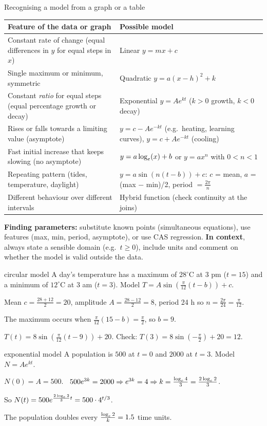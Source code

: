 \begin{keyres}{Recognising a model from a graph or a table}
\begin{center}
\small
\begin{tabularx}{\linewidth}{@{}lL@{}}
\toprule
Feature of the data or graph & Possible model \\
\midrule
Constant rate of change (equal differences in $y$ for equal steps in $x$) & Linear $y=mx+c$ \\
Single maximum or minimum, symmetric & Quadratic $y=a(x-h)^2+k$ \\
Constant \emph{ratio} for equal steps (equal percentage growth or decay) & Exponential $y=Ae^{kt}$ ($k>0$ growth, $k<0$ decay) \\
Rises or falls towards a limiting value (asymptote) & $y=c-Ae^{-kt}$ (e.g.\ heating, learning curves), $y=c+Ae^{-kt}$ (cooling) \\
Fast initial increase that keeps slowing (no asymptote) & $y=a\log_e(x)+b$ or $y=ax^n$ with $0<n<1$ \\
Repeating pattern (tides, temperature, daylight) & $y=a\sin(n(t-b))+c$: $c$ = mean, $a$ = (max $-$ min)/2, period $=\frac{2\pi}{n}$ \\
Different behaviour over different intervals & Hybrid function (check continuity at the joins) \\
\bottomrule
\end{tabularx}
\end{center}
\textbf{Finding parameters:} substitute known points (simultaneous equations), use features (max, min, period, asymptote), or use CAS regression. \textbf{In context}, always state a sensible domain (e.g.\ $t\ge0$), include units and comment on whether the model is valid outside the data.
\end{keyres}

\begin{cols}
\begin{example}{circular model}
A day's temperature has a maximum of $28^\circ$C at 3 pm ($t=15$) and a minimum of $12^\circ$C at 3 am ($t=3$). Model $T=A\sin\!\left(\frac{\pi}{12}(t-b)\right)+c$.\par
Mean $c=\frac{28+12}{2}=20$, amplitude $A=\frac{28-12}{2}=8$, period 24 h so $n=\frac{2\pi}{24}=\frac{\pi}{12}$.\par
The maximum occurs when $\frac{\pi}{12}(15-b)=\frac{\pi}{2}$, so $b=9$.\par
$T(t)=8\sin\!\left(\frac{\pi}{12}(t-9)\right)+20$. Check: $T(3)=8\sin\!\left(-\frac{\pi}{2}\right)+20=12$. \tick
\end{example}
\nextcol
\begin{example}{exponential model}
A population is $500$ at $t=0$ and $2000$ at $t=3$. Model $N=Ae^{kt}$.\par
$N(0)=A=500$. \ $500e^{3k}=2000\Rightarrow e^{3k}=4\Rightarrow k=\frac{\log_e4}{3}=\frac{2\log_e2}{3}$.\par
So $N(t)=500e^{\frac{2\log_e2}{3}t}=500\cdot4^{t/3}$.\par
The population doubles every $\frac{\log_e2}{k}=1.5$ time units.
\end{example}
\end{cols}
